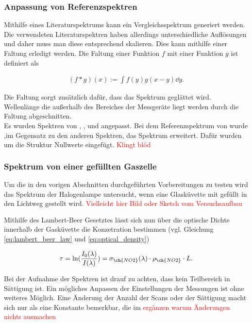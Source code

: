 \documentclass[12pt, a4paper, bibliography=totoc]{scrartcl}
\begin{document}
\begin{multicols}{2}
\subsubsection{Anpassung von Referenzspektren}\label{sssec:convolution_of_reference}

Mithilfe eines Literaturspektrums kann ein Vergleichsspektrum generiert werden. 
Die verwendeten Literaturspektren haben allerdings unterschiedliche Auflösungen und daher muss man diese entsprechend skalieren.
Dies kann mithilfe einer Faltung erledigt werden.
Die Faltung einer Funktion $f$ mit einer Funktion $g$ ist definiert als

\begin{align}
    (f \ast g) (x) := \int f(y) g(x-y) \dd y .
\end{align}

Die Faltung sorgt zusätzlich dafür, dass das Spektrum geglättet wird.
Wellenlänge die außerhalb des Bereiches der Messgeräte liegt werden durch die Faltung abgeschnitten.\\
Es wurden Spektren von  , ,  und  angepasst.
Bei dem Referenzspektrum von  wurde ,im Gegensatz zu den anderen Spektren, das Spektrum erweitert. Dafür wurden um die Struktur Nullwerte eingefügt. \textcolor{red}{Klingt blöd}
 
\subsubsection{ Spektrum von einer gefüllten Gaszelle}\label{sssec:lab_no2_spectra}

Um die in den vorigen Abschnitten durchgeführten Vorbereitungen zu testen wird das Spektrum der Halogenlampe untersucht, wenn eine Glasküvette mit  gefüllt in den Lichtweg gestellt wird.
\textcolor{red}{Vielleicht hier Bild oder Sketch vom Versuchsaufbau}

Mithilfe des Lambert-Beer Gesetztes lässt sich nun über die optische Dichte innerhalb der Gasküvette die Konzetration bestimmen (vgl. Gleichung \eqref{eq:lambert_beer_law} und \eqref{eq:optical_density})

\begin{align}
\tau = \ln(\frac{I_0(\lambda)}{I(\lambda)}) = \sigma_{\ch{NO2}}(\lambda) \cdot \rho_{\ch{NO2}} \cdot L.
\end{align}

Bei der Aufnahme der Spektren ist drauf zu achten, dass kein Teilbereich in Sättigung ist. Ein mögliches Anpassen der Einstellungen der Messungen ist ohne weiteres Möglich. Eine Änderung der Anzahl der Scans oder der Sättigung macht sich nur als eine Konstante bemerkbar, die im 
\textcolor{red}{ergänzen warum Änderungen nichts ausmachen}


\end{multicols}
\end{document}

